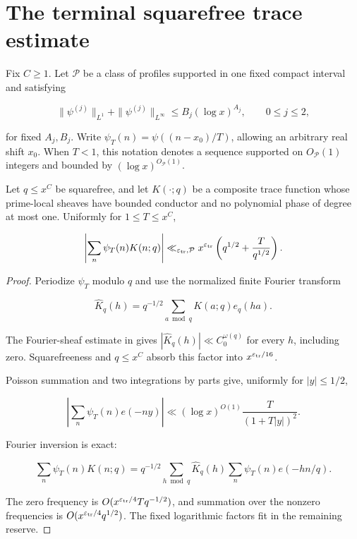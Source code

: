 \section{The terminal squarefree trace estimate}
\label{sec:terminal}

Fix $C\ge1$.  Let $\mathcal P$ be a class of profiles supported in one
fixed compact interval and satisfying

\begin{equation}\label{eq:profile-bounds}
 \|\psi^{(j)}\|_{L^1}+\|\psi^{(j)}\|_{L^\infty}
 \le B_j(\log x)^{A_j},\qquad 0\le j\le2,
\end{equation}

for fixed $A_j,B_j$.  Write
$\psi_T(n)=\psi((n-x_0)/T)$, allowing an arbitrary real shift $x_0$.
When $T<1$, this notation denotes a sequence supported on $O_{\mathcal P}(1)$
integers and bounded by $(\log x)^{O_{\mathcal P}(1)}$.

\begin{lemma}\label{lem:long-completion}
Let $q\le x^C$ be squarefree, and let $K(\cdot;q)$ be a composite trace
function whose prime-local sheaves have bounded conductor and no polynomial
phase of degree at most one.  Uniformly for $1\le T\le x^C$,

\begin{equation}\label{eq:long-completion}
 \left|\sum_n\psi_T(n)K(n;q)\right|
 \ll_{\varepsilon_{\rm tr},\mathcal P}x^{\varepsilon_{\rm tr}}
 \left(q^{1/2}+\frac{T}{q^{1/2}}\right).
\end{equation}
\end{lemma}

\begin{proof}
Periodize $\psi_T$ modulo $q$ and use the normalized finite Fourier
transform

\[
 \widehat K_q(h)=q^{-1/2}\sum_{a\bmod q}K(a;q)e_q(ha).
\]

The Fourier-sheaf estimate in
\cite[Corollary~6.24]{PolymathEDZ2014} gives
$|\widehat K_q(h)|\ll C_0^{\omega(q)}$ for every $h$, including zero.
Squarefreeness and $q\le x^C$ absorb this factor into
$x^{\varepsilon_{\rm tr}/16}$.

Poisson summation and two integrations by parts give, uniformly for
$|y|\le1/2$,

\[
 \left|\sum_n\psi_T(n)e(-ny)\right|
 \ll(\log x)^{O(1)}\frac{T}{(1+T|y|)^2}.
\]

Fourier inversion is exact:

\[
 \sum_n\psi_T(n)K(n;q)
 =q^{-1/2}\sum_{h\bmod q}\widehat K_q(h)
 \sum_n\psi_T(n)e(-hn/q).
\]

The zero frequency is
$O(x^{\varepsilon_{\rm tr}/4}Tq^{-1/2})$, and summation over the nonzero
frequencies is $O(x^{\varepsilon_{\rm tr}/4}q^{1/2})$.  The fixed logarithmic
factors fit in the remaining reserve.
\end{proof}

